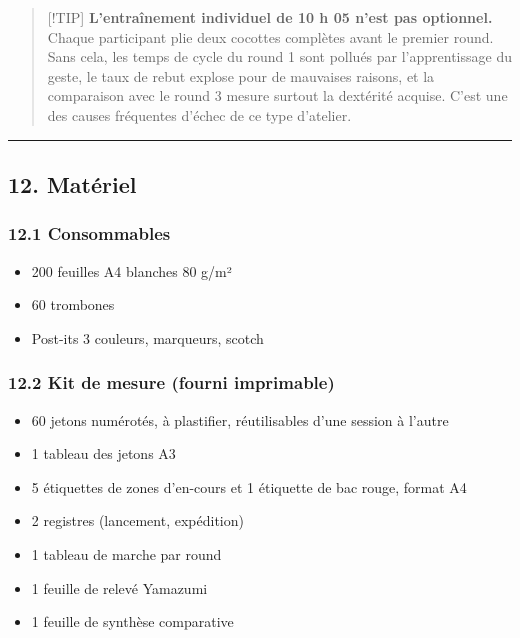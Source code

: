\documentclass[
]{article}
\providecommand{\tightlist}{%
  \setlength{\itemsep}{0pt}\setlength{\parskip}{0pt}}
\begin{document}
\begin{quote}
{[}!TIP{]} \textbf{L'entraînement individuel de 10 h 05 n'est pas
optionnel.} Chaque participant plie deux cocottes complètes avant le
premier round. Sans cela, les temps de cycle du round 1 sont pollués par
l'apprentissage du geste, le taux de rebut explose pour de mauvaises
raisons, et la comparaison avec le round 3 mesure surtout la dextérité
acquise. C'est une des causes fréquentes d'échec de ce type d'atelier.
\end{quote}

\begin{center}\rule{0.5\linewidth}{0.5pt}\end{center}

\subsection{12. Matériel}\label{matuxe9riel}

\subsubsection{12.1 Consommables}\label{consommables}

\begin{itemize}
\tightlist
\item
  200 feuilles A4 blanches 80 g/m²
\item
  60 trombones
\item
  Post-its 3 couleurs, marqueurs, scotch
\end{itemize}

\subsubsection{12.2 Kit de mesure (fourni
imprimable)}\label{kit-de-mesure-fourni-imprimable}

\begin{itemize}
\tightlist
\item
  60 jetons numérotés, à plastifier, réutilisables d'une session à
  l'autre
\item
  1 tableau des jetons A3
\item
  5 étiquettes de zones d'en-cours et 1 étiquette de bac rouge, format
  A4
\item
  2 registres (lancement, expédition)
\item
  1 tableau de marche par round
\item
  1 feuille de relevé Yamazumi
\item
  1 feuille de synthèse comparative
\end{itemize}
\end{document}
